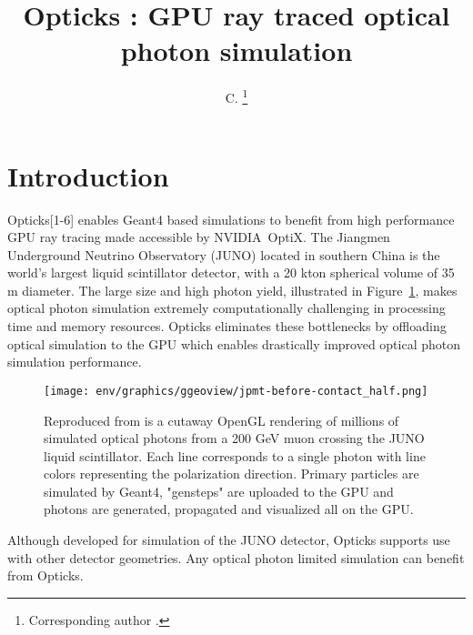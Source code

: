 \documentclass{webofc}
\begin{document}
\title{Opticks : GPU ray traced optical photon simulation}
\author{ C. \fnsep\thanks{Corresponding author .}}
\abstract{}
\maketitle
%
\section{Introduction}%
\label{intro}
%
Opticks[1-6] enables Geant4\cite{g4} based simulations 
to benefit from high performance GPU ray tracing made accessible 
by NVIDIA\textregistered\ OptiX\texttrademark\cite{optix}.
%
The Jiangmen Underground Neutrino Observatory (JUNO)\cite{juno} 
located in southern China is the world's largest liquid scintillator detector, 
with a 20 kton spherical volume of 35 m diameter. The large size and high photon yield, illustrated in Figure~\ref{problem}, 
makes optical photon simulation extremely computationally challenging in processing time and memory resources. 
Opticks eliminates these bottlenecks by offloading optical simulation to the GPU which
enables drastically improved optical photon simulation performance.
%
\begin{figure}
\centering
\texttt{[image: env/graphics/ggeoview/jpmt-before-contact\_half.png]}
\caption{
Reproduced from\cite{chep2019} is a cutaway OpenGL rendering of millions of simulated optical photons from a 200 GeV muon crossing the JUNO liquid scintillator. 
Each line corresponds to a single photon with line colors representing the polarization direction. 
Primary particles are simulated by Geant4, "gensteps" are uploaded to the GPU and photons are generated, propagated
and visualized all on the GPU. 
}
\label{problem}
\vspace{-5mm}
\end{figure}%
%
%
Although developed for simulation of the JUNO detector, Opticks
supports use with other detector geometries. 
Any optical photon limited simulation can benefit from Opticks.
\end{document}
